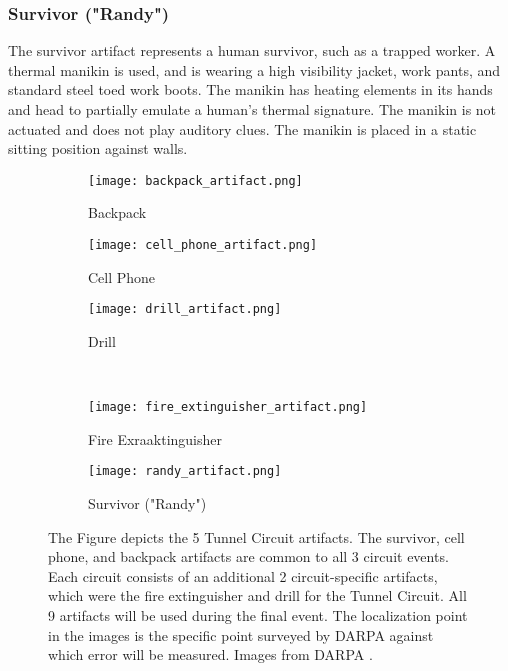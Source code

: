 \subsubsection{Survivor ("Randy")}

The survivor artifact represents a human survivor, such as a trapped worker. A thermal manikin is used, and is wearing a high visibility jacket, work pants, and standard steel toed work boots. The manikin has heating elements in its hands and head to partially emulate a human's thermal signature. The manikin is not actuated and does not play auditory clues. The manikin is placed in a static sitting position against walls.

\begin{figure}
	\centering
	\begin{subfigure}{0.32\textwidth}
		\texttt{[image: backpack\_artifact.png]}
		\caption{Backpack}
		\label{backpack}		
	\end{subfigure}
	\hfill
	\begin{subfigure}{0.32\textwidth}
		\texttt{[image: cell\_phone\_artifact.png]}
		\caption{Cell Phone}
		\label{cell phone}
	\end{subfigure}	
	\hfill
	\begin{subfigure}{0.32\textwidth}
		\texttt{[image: drill\_artifact.png]}
		\caption{Drill}
		\label{drill}
	\end{subfigure}
	\\
	\begin{subfigure}{0.32\textwidth}
		\texttt{[image: fire\_extinguisher\_artifact.png]}
		\caption{Fire Exraaktinguisher}
		\label{fire extinguisher}
	\end{subfigure}
	\begin{subfigure}{0.32\textwidth}
		\texttt{[image: randy\_artifact.png]}
		\caption{Survivor ("Randy")}
		\label{randy}
	\end{subfigure}	
	\caption[Tunnel Circuit artifacts]{The Figure depicts the 5 Tunnel Circuit artifacts. The survivor, cell phone, and backpack artifacts are common to all 3 circuit events. Each circuit consists of an additional 2 circuit-specific artifacts, which were the fire extinguisher and drill for the Tunnel Circuit. All 9 artifacts will be used during the final event. The localization point in the images is the specific point surveyed by DARPA against which error will be measured. Images from DARPA \cite{tunnel_artifacts}.}
	\label{tunnel artifacts}
\end{figure}

